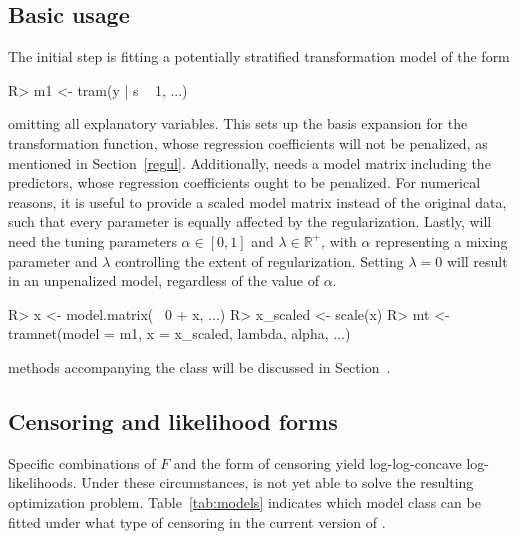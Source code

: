 \subsection{Basic usage} \label{subsec:usage}

The initial step is fitting a potentially stratified transformation model of
the form
\begin{example}
R> m1 <- tram(y | s ~ 1, ...)
\end{example}
omitting all explanatory variables. This sets up the basis expansion for the
transformation function, whose regression coefficients will not be penalized, as
mentioned in Section~\ref{regul}.
Additionally,  needs a model matrix including the predictors, whose
regression coefficients ought to be penalized. For numerical reasons, it is useful
to provide a scaled model matrix instead of the original data, such that every
parameter is equally affected by the regularization.
Lastly,  will need the tuning parameters $\alpha \in [0, 1]$ and
$\lambda \in \mathbb{R}^+$, with $\alpha$ representing a mixing parameter and
$\lambda$ controlling the extent of regularization. Setting $\lambda = 0$ will
result in an unpenalized model, regardless of the value of $\alpha$.
\begin{example}
R> x <- model.matrix(~ 0 + x, ...)
R> x_scaled <- scale(x)
R> mt <- tramnet(model = m1, x = x_scaled, lambda, alpha, ...)
\end{example}
 methods accompanying the  class will be discussed in 
Section~.

\subsection{Censoring and likelihood forms} \label{subsec:modelclasses}

Specific combinations of $F$ and the form of censoring yield log-log-concave
log-likelihoods. Under these circumstances,  is not yet able to solve
the resulting optimization problem. 
Table~\ref{tab:models} indicates which model class can be fitted under what type 
of censoring in the current version of .

